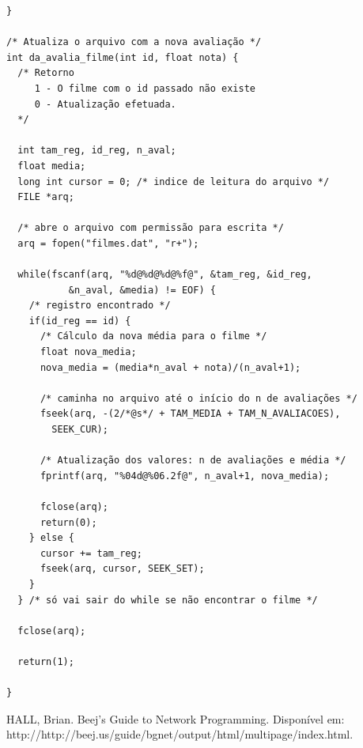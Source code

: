 \documentclass[11pt,twoside]{article}
\begin{document}
\begin{verbatim}
}

/* Atualiza o arquivo com a nova avaliação */
int da_avalia_filme(int id, float nota) {
  /* Retorno
     1 - O filme com o id passado não existe
     0 - Atualização efetuada.
  */

  int tam_reg, id_reg, n_aval;
  float media;
  long int cursor = 0; /* indice de leitura do arquivo */
  FILE *arq;

  /* abre o arquivo com permissão para escrita */
  arq = fopen("filmes.dat", "r+");

  while(fscanf(arq, "%d@%d@%d@%f@", &tam_reg, &id_reg, 
	       &n_aval, &media) != EOF) {
    /* registro encontrado */
    if(id_reg == id) {
      /* Cálculo da nova média para o filme */
      float nova_media;
      nova_media = (media*n_aval + nota)/(n_aval+1);
      
      /* caminha no arquivo até o início do n de avaliações */
      fseek(arq, -(2/*@s*/ + TAM_MEDIA + TAM_N_AVALIACOES), 
	    SEEK_CUR);

      /* Atualização dos valores: n de avaliações e média */
      fprintf(arq, "%04d@%06.2f@", n_aval+1, nova_media);

      fclose(arq);
      return(0);
    } else {
      cursor += tam_reg;
      fseek(arq, cursor, SEEK_SET);
    }
  } /* só vai sair do while se não encontrar o filme */
  
  fclose(arq);
  
  return(1);

}
\end{verbatim}




\begin{thebibliography}{99}
 HALL, Brian. Beej's Guide to Network Programming. Disponível em: http://http://beej.us/guide/bgnet/output/html/multipage/index.html.
\end{thebibliography}
\end{document}
